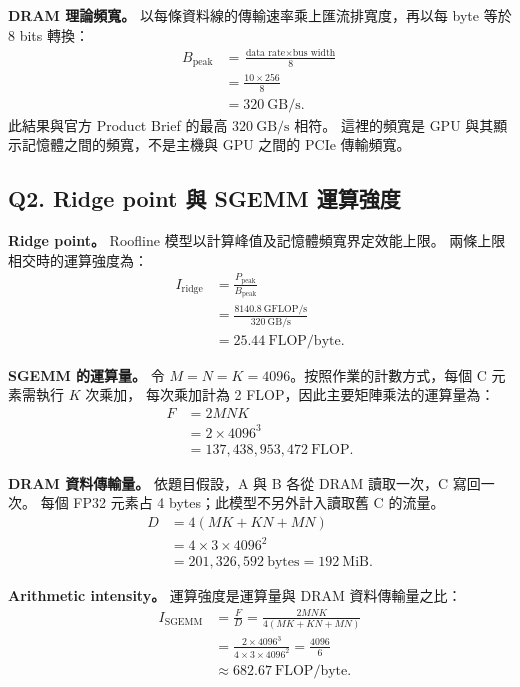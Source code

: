 \documentclass[UTF8,fontset=none,11pt,a4paper]{ctexart}
\begin{document}
\textbf{DRAM 理論頻寬。}
以每條資料線的傳輸速率乘上匯流排寬度，再以每 byte 等於 8 bits 轉換：
\begin{align*}
B_{\mathrm{peak}}
  &=\frac{\text{data rate}\times\text{bus width}}{8}\\
  &=\frac{10\times256}{8}\\
  &=320\ \mathrm{GB/s}.
\end{align*}
此結果與官方 Product Brief 的最高 $320\ \mathrm{GB/s}$ 相符。
這裡的頻寬是 GPU 與其顯示記憶體之間的頻寬，不是主機與 GPU 之間的
PCIe 傳輸頻寬。

\subsection*{Q2. Ridge point 與 SGEMM 運算強度}

\textbf{Ridge point。}
Roofline 模型以計算峰值及記憶體頻寬界定效能上限。
兩條上限相交時的運算強度為：
\begin{align*}
I_{\mathrm{ridge}}
  &=\frac{P_{\mathrm{peak}}}{B_{\mathrm{peak}}}\\
  &=\frac{8140.8\ \mathrm{GFLOP/s}}{320\ \mathrm{GB/s}}\\
  &=25.44\ \mathrm{FLOP/byte}.
\end{align*}

\textbf{SGEMM 的運算量。}
令 $M=N=K=4096$。按照作業的計數方式，每個 C 元素需執行 $K$ 次乘加，
每次乘加計為 2 FLOP，因此主要矩陣乘法的運算量為：
\begin{align*}
F&=2MNK\\
 &=2\times4096^3\\
 &=137{,}438{,}953{,}472\ \mathrm{FLOP}.
\end{align*}

\textbf{DRAM 資料傳輸量。}
依題目假設，A 與 B 各從 DRAM 讀取一次，C 寫回一次。
每個 FP32 元素占 4 bytes；此模型不另外計入讀取舊 C 的流量。
\begin{align*}
D&=4(MK+KN+MN)\\
 &=4\times3\times4096^2\\
 &=201{,}326{,}592\ \mathrm{bytes}
  =192\ \mathrm{MiB}.
\end{align*}

\textbf{Arithmetic intensity。}
運算強度是運算量與 DRAM 資料傳輸量之比：
\begin{align*}
I_{\mathrm{SGEMM}}
  &=\frac{F}{D}
   =\frac{2MNK}{4(MK+KN+MN)}\\
  &=\frac{2\times4096^3}{4\times3\times4096^2}
   =\frac{4096}{6}\\
  &\approx682.67\ \mathrm{FLOP/byte}.
\end{align*}
\end{document}
